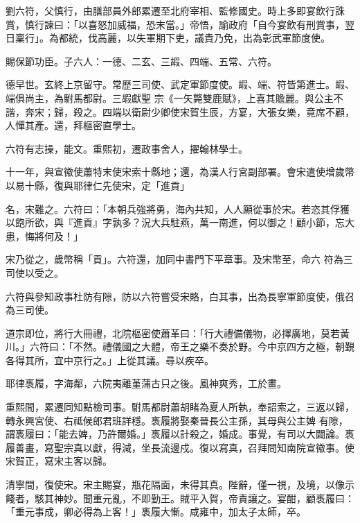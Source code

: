 \begin{pinyinscope}
 劉六符，父慎行，由膳部員外郎累遷至北府宰相、監修國史。時上多即宴飲行誅賞，慎行諫曰：「以喜怒加威福，恐末當。」帝悟，諭政府「自今宴飲有刑賞事，翌日稟行」。為都統，伐高麗，以失軍期下吏，議貴乃免，出為彰武軍節度使。



 賜保節功臣。子六人：一德、二玄、三嘏、四端、五常、六符。



 德早世。玄終上京留守。常歷三司使、武定軍節度使。嘏、端、符皆第進士。嘏、端俱尚主，為駙馬都尉。三嘏獻聖
 宗《一矢斃雙鹿賦》，上喜其贍麗。與公主不諧，奔宋；歸，殺之。四端以衛尉少卿使宋賀生辰，方宴，大張女樂，竟席不顧，人憚其產。還，拜樞密直學士。



 六符有志操，能文。重熙初，遷政事舍人，擢翰林學士。



 十一年，與宣徽使蕭特末使宋索十縣地；還，為漢人行宮副部署。會宋遣使增歲幣以易十縣，復與耶律仁先使宋，定「進貢」



 名，宋難之。六符曰：「本朝兵強將勇，海內共知，人人願從事於宋。若恣其俘獲以飽所欲，與『進貢』字孰多？況大兵駐燕，萬一南進，何以御之！顧小節，忘大患，悔將何及！」



 宋乃從之，歲幣稱「貢」。六符還，加同中書門下平章事。及宋幣至，命六
 符為三司使以受之。



 六符與參知政事杜防有隙，防以六符嘗受宋賂，白其事，出為長寧軍節度使，俄召為三司使。



 道宗即位，將行大冊禮，北院樞密使蕭革曰：「行大禮備儀物，必擇廣地，莫若黃川。」六符曰：「不然。禮儀國之大體，帝王之樂不奏於野。今中京四方之極，朝覲各得其所，宜中京行之。」上從其議。尋以疾卒。



 耶律褭履，字海鄰，六院夷離堇蒲古只之後。風神爽秀，工於畫。



 重熙間，累遷同知點檢司事。駙馬都尉蕭胡睹為夏人所執，奉詔索之，三返以歸，轉永興宮使、右祗候郎君班詳穩。褭履將娶秦晉長公主孫，其母與公主婢
 有隙，謂褭履曰：「能去婢，乃許爾婚。」褭履以計殺之，婚成。事覺，有司以大闢論。褭履善畫，寫聖宗真以獻，得減，坐長流邊戍。復以寫真，召拜問知南院宣徽事。使宋賀正，寫宋主客以歸。



 清寧間，復使宋。宋主賜宴，瓶花隔面，未得其真。陛辭，僅一視，及境，以像示餞者，駭其神妙。聞重元亂，不即勤王。賊平入賀，帝責讓之。宴酣，顧褭履曰：「重元事成，卿必得為上客！」褭履大慚。咸雍中，加太子太師，卒。




\end{pinyinscope}
